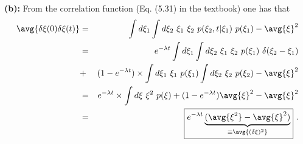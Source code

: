 \textbf{(b):} 
From the correlation function (Eq. (5.31) in the textbook) one has that
\begin{eqnarray}
\avg{\delta \xi(0) \delta \xi(t)} &=& \int d \xi_1\int d\xi_2~\xi_1~\xi_2 ~p(\xi_2, t|\xi_1)~p(\xi_1) - \avg{\xi}^2 \nonumber \\
&=& e^{-\lambda t} \int d \xi_1\int d\xi_2~\xi_1~\xi_2 ~p(\xi_1)~\delta(\xi_2-\xi_1)  \nonumber \\
&+&(1-e^{-\lambda t}) \times \int d \xi_1~\xi_1~p(\xi_1) \int d\xi_2~\xi_2 ~p(\xi_2) - \avg{\xi}^2 \nonumber \\
&=& e^{-\lambda t} \times \int d \xi~\xi^2 ~p(\xi) + (1-e^{-\lambda t}) \avg{\xi}^2 - \avg{\xi}^2 \nonumber \\
&=& \boxed{e^{-\lambda t} \underbrace{(\avg{\xi^2} - \avg{\xi}^2)}_{\equiv \avg{(\delta \xi)^2}}}~. \nonumber \\
\end{eqnarray}